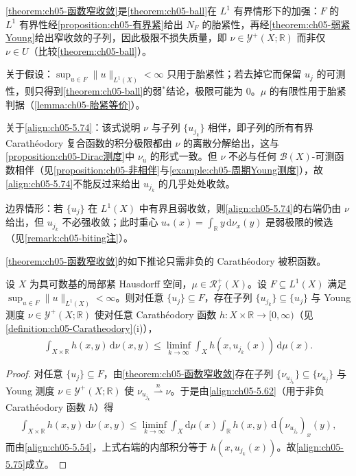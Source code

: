 \documentclass[../../main.tex]{subfiles}%
\begin{document}
\begin{remark}\label{remark:ch05-窄紧性}
\cref{theorem:ch05-函数窄收敛}是\cref{theorem:ch05-ball}在 $L^1$ 有界情形下的加强：$F$ 的 $L^1$ 有界性经\cref{proposition:ch05-有界紧}给出 $N_F$ 的胎紧性，再经\cref{theorem:ch05-弱紧Young}给出窄收敛的子列，因此极限不损失质量，即 $\nu\in\mathcal{Y}^+(X;\mathbb{R})$ 而非仅 $\nu\in U$（比较\cref{theorem:ch05-ball}）。

关于假设：$\sup_{u\in F}\|u\|_{L^1(X)}<\infty$ 只用于胎紧性；若去掉它而保留 $u_j$ 的可测性，则只得到\cref{theorem:ch05-ball}的弱$^*$结论，极限可能为 $0$。$\mu$ 的有限性用于胎紧判据（\cref{lemma:ch05-胎紧等价}）。

关于\eqref{align:ch05-5.74}：该式说明 $\nu$ 与子列 $\{u_{j_k}\}$ 相伴，即子列的所有有界 Carathéodory 复合函数的积分极限都由 $\nu$ 的离散分解给出，这与\cref{proposition:ch05-Dirac测度}中 $\nu_u$ 的形式一致。但 $\nu$ 不必与任何 $\mathscr{B}(X)$-可测函数相伴（见\cref{proposition:ch05-非相伴}与\cref{example:ch05-周期Young测度}），故\eqref{align:ch05-5.74}不能反过来给出 $u_{j_k}$ 的几乎处处收敛。

边界情形：若 $\{u_j\}$ 在 $L^1(X)$ 中有界且弱收敛，则\eqref{align:ch05-5.74}的右端仍由 $\nu$ 给出，但 $u_{j_k}$ 不必强收敛；此时重心 $u_*(x)=\int_{\mathbb{R}}y\,\mathrm{d}\nu_x(y)$ 是弱极限的候选（见\cref{remark:ch05-biting注}）。
\end{remark}

\cref{theorem:ch05-函数窄收敛}的如下推论只需非负的 Carathéodory 被积函数。

\begin{corollary}\label{corollary:ch05-下半连续}
设 $X$ 为具可数基的局部紧 Hausdorff 空间，$\mu\in\mathscr{R}^+_f(X)$。设 $F\subseteq L^1(X)$ 满足 $\sup_{u\in F}\|u\|_{L^1(X)}<\infty$。则对任意 $\{u_j\}\subseteq F$，存在子列 $\{u_{j_k}\}\subseteq\{u_j\}$ 与 Young 测度 $\nu\in\mathcal{Y}^+(X;\mathbb{R})$ 使对任意 Carathéodory 函数 $h:X\times\mathbb{R}\to[0,\infty)$（见\cref{definition:ch05-Caratheodory}(i)），
\begin{align}
\int_{X\times\mathbb{R}}h(x,y)\,\mathrm{d}\nu(x,y)
\leqslant\liminf_{k\to\infty}\int_Xh(x,u_{j_k}(x))\,\mathrm{d}\mu(x).\label{align:ch05-5.75}
\end{align}
\end{corollary}

\begin{proof}
对任意 $\{u_j\}\subseteq F$，由\cref{theorem:ch05-函数窄收敛}存在子列 $\{\nu_{u_{j_k}}\}\subseteq\{\nu_{u_j}\}$ 与 Young 测度 $\nu\in\mathcal{Y}^+(X;\mathbb{R})$ 使 $\nu_{u_{j_k}}\stackrel{n}{\rightharpoonup}\nu$。于是由\eqref{align:ch05-5.62}（用于非负 Carathéodory 函数 $h$）得
\begin{align*}
\int_{X\times\mathbb{R}}h(x,y)\,\mathrm{d}\nu(x,y)
\leqslant\liminf_{k\to\infty}\int_X\mathrm{d}\mu(x)\int_{\mathbb{R}}h(x,y)\,\mathrm{d}(\nu_{u_{j_k}})_x(y),
\end{align*}
而由\eqref{align:ch05-5.54}，上式右端的内部积分等于 $h(x,u_{j_k}(x))$。故\eqref{align:ch05-5.75}成立。
\end{proof}
\end{document}
